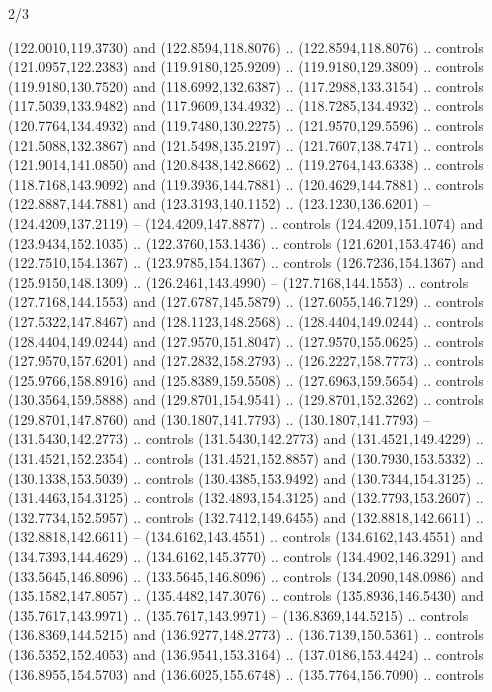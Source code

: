 \begin{flagdescription}{2/3}
\begin{scope}[xshift=0.5\flaglength,yshift=0.5\flagwidth,scale=\flagwidth/180]
\begin{scope}[y=0.8pt, x=0.8pt, yscale=-1,shift={(-168.75,-108.75)}]
  (122.0010,119.3730) and (122.8594,118.8076) .. (122.8594,118.8076) .. controls
  (121.0957,122.2383) and (119.9180,125.9209) .. (119.9180,129.3809) .. controls
  (119.9180,130.7520) and (118.6992,132.6387) .. (117.2988,133.3154) .. controls
  (117.5039,133.9482) and (117.9609,134.4932) .. (118.7285,134.4932) .. controls
  (120.7764,134.4932) and (119.7480,130.2275) .. (121.9570,129.5596) .. controls
  (121.5088,132.3867) and (121.5498,135.2197) .. (121.7607,138.7471) .. controls
  (121.9014,141.0850) and (120.8438,142.8662) .. (119.2764,143.6338) .. controls
  (118.7168,143.9092) and (119.3936,144.7881) .. (120.4629,144.7881) .. controls
  (122.8887,144.7881) and (123.3193,140.1152) .. (123.1230,136.6201) --
  (124.4209,137.2119) -- (124.4209,147.8877) .. controls (124.4209,151.1074) and
  (123.9434,152.1035) .. (122.3760,153.1436) .. controls (121.6201,153.4746) and
  (122.7510,154.1367) .. (123.9785,154.1367) .. controls (126.7236,154.1367) and
  (125.9150,148.1309) .. (126.2461,143.4990) -- (127.7168,144.1553) .. controls
  (127.7168,144.1553) and (127.6787,145.5879) .. (127.6055,146.7129) .. controls
  (127.5322,147.8467) and (128.1123,148.2568) .. (128.4404,149.0244) .. controls
  (128.4404,149.0244) and (127.9570,151.8047) .. (127.9570,155.0625) .. controls
  (127.9570,157.6201) and (127.2832,158.2793) .. (126.2227,158.7773) .. controls
  (125.9766,158.8916) and (125.8389,159.5508) .. (127.6963,159.5654) .. controls
  (130.3564,159.5888) and (129.8701,154.9541) .. (129.8701,152.3262) .. controls
  (129.8701,147.8760) and (130.1807,141.7793) .. (130.1807,141.7793) --
  (131.5430,142.2773) .. controls (131.5430,142.2773) and (131.4521,149.4229) ..
  (131.4521,152.2354) .. controls (131.4521,152.8857) and (130.7930,153.5332) ..
  (130.1338,153.5039) .. controls (130.4385,153.9492) and (130.7344,154.3125) ..
  (131.4463,154.3125) .. controls (132.4893,154.3125) and (132.7793,153.2607) ..
  (132.7734,152.5957) .. controls (132.7412,149.6455) and (132.8818,142.6611) ..
  (132.8818,142.6611) -- (134.6162,143.4551) .. controls (134.6162,143.4551) and
  (134.7393,144.4629) .. (134.6162,145.3770) .. controls (134.4902,146.3291) and
  (133.5645,146.8096) .. (133.5645,146.8096) .. controls (134.2090,148.0986) and
  (135.1582,147.8057) .. (135.4482,147.3076) .. controls (135.8936,146.5430) and
  (135.7617,143.9971) .. (135.7617,143.9971) -- (136.8369,144.5215) .. controls
  (136.8369,144.5215) and (136.9277,148.2773) .. (136.7139,150.5361) .. controls
  (136.5352,152.4053) and (136.9541,153.3164) .. (137.0186,153.4424) .. controls
  (136.8955,154.5703) and (136.6025,155.6748) .. (135.7764,156.7090) .. controls

\end{scope}
\end{scope}
\end{flagdescription}

